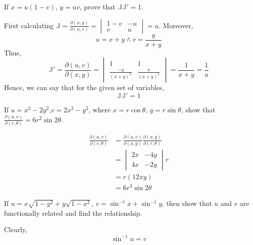 \begin{asign}
	If $x=u(1-v)$, $y=uv$, prove that $\mathbb{J}\mathbb{J}'=1$.
\end{asign}
\begin{anse}
	First calculating $\mathbb{J}=\frac{\partial(x,y)}{\partial(u,v)}=\begin{vmatrix}
	1-v & -u\\
	v & u
	\end{vmatrix}=u$.
	Moreover, 
	\[u=x+y \land v=\frac{y}{x+y}\]
	Thus,
	\[\mathbb{J}'=\frac{\partial(u,v)}{\partial(x,y)}=\begin{vmatrix}
		1 & 1\\
		\frac{-y}{(x+y)^2} & \frac{x}{(x+y)^2}
	\end{vmatrix}=\frac{1}{x+y}=\frac{1}{u}\]
	Hence, we can say that for the given set of variables,
	\[\mathbb{J}\mathbb{J}'=1\]
\end{anse}
\begin{asign}
	If $u=x^2-2y^2$,$v=2x^2-y^2$, where $x=r\cos\theta$, $y=r\sin\theta$, show that $\frac{\partial(u,v)}{\partial(r,\theta)}=6r^2\sin2\theta$.
\end{asign}
\begin{anse}
	\[\begin{split}
		\frac{\partial(u,v)}{\partial(r,\theta)}&=\frac{\partial(u,v)}{\partial(x,y)}\frac{\partial(x,y)}{\partial(r,\theta)}\\
		&=\begin{vmatrix}
			2x& -4y\\
			4x & -2y
		\end{vmatrix}r\\
		&=r(12xy)\\
		&=6r^3\sin2\theta
	\end{split}\]
\end{anse}
\begin{asign}
	If $u=x\sqrt{1-y^2}+y\sqrt{1-x^2}$, $v=\sin^{-1}x+\sin^{-1}y$, then show that $u$ and $v$ are functionally related and find the relationship.
\end{asign}
\begin{anse}
	Clearly,
	\[\sin^{-1}u=v\]
\end{anse}
